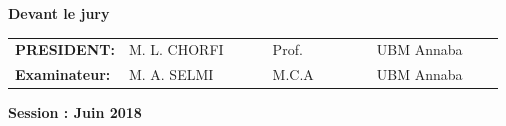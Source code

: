 \documentclass[12pt,a4paper]{article}
\begin{document}
\vspace{1\baselineskip}
\begin{center}
\large\textbf{Devant le jury} \vspace{1.5\baselineskip}\\
\end{center}
\begin{tabular}{llllll}
\textbf{PRESIDENT: } & M. L. CHORFI  & \ \ \ \ \ Prof. & \ \ \ \ \ \ \ UBM Annaba  \\
\textbf{Examinateur: } & M. A. SELMI & \ \ \ \ \ M.C.A & \ \ \ \ \ \ \ UBM Annaba 
\end{tabular}
\vspace{2\baselineskip} 
\begin{center}
\large\textbf{ Session : Juin 2018}\\
\end{center}
\end{document}
